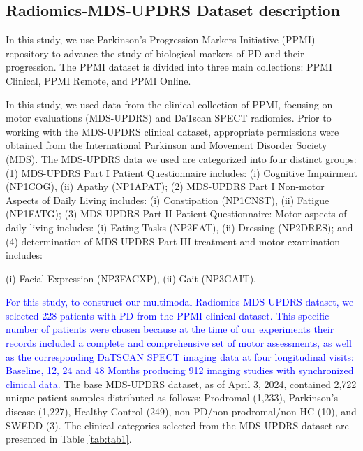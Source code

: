 \documentclass[twocolumn]{article}
\begin{document}



\subsection{Radiomics-MDS-UPDRS Dataset description}

In this study, we use Parkinson's Progression Markers Initiative (PPMI) \cite{marek2011parkinson} repository to advance the study of biological markers of PD and their progression. The PPMI dataset is divided into three main collections: PPMI Clinical, PPMI Remote, and PPMI Online. 

In this study, we used data from the clinical collection of PPMI, focusing on motor evaluations (MDS-UPDRS) and DaTscan SPECT radiomics. Prior to working with the MDS-UPDRS clinical dataset, appropriate permissions were obtained from the International Parkinson and Movement Disorder Society (MDS). The MDS-UPDRS data we used are categorized into four distinct groups: (1) MDS-UPDRS Part I Patient Questionnaire includes: (i) Cognitive Impairment (NP1COG), (ii) Apathy (NP1APAT); (2) MDS-UPDRS Part I Non-motor Aspects of Daily Living includes: (i) Constipation (NP1CNST), (ii) Fatigue (NP1FATG); (3) MDS-UPDRS Part II Patient Questionnaire: Motor aspects of daily living includes: (i) Eating Tasks (NP2EAT), (ii) Dressing (NP2DRES); and (4) determination of MDS-UPDRS Part III treatment and motor examination includes:

(i) Facial Expression  (NP3FACXP), (ii) Gait (NP3GAIT). 

\textcolor{blue}{For this study, to construct our multimodal Radiomics-MDS-UPDRS dataset, we selected 228 patients with PD from the PPMI clinical dataset. This specific number of patients were chosen because at the time of our experiments their records included a complete and comprehensive set of motor assessments, as well as the corresponding DaTSCAN SPECT imaging data at four longitudinal visits: Baseline, 12, 24 and 48 Months producing 912 imaging studies with synchronized clinical data.} The base MDS-UPDRS dataset, as of April 3, 2024, contained 2,722 unique patient samples distributed as follows: Prodromal (1,233), Parkinson's disease (1,227), Healthy Control (249), non-PD/non-prodromal/non-HC (10), and SWEDD (3). The clinical categories selected from the MDS-UPDRS dataset are presented in Table \ref{tab:tab1}.
\end{document}
